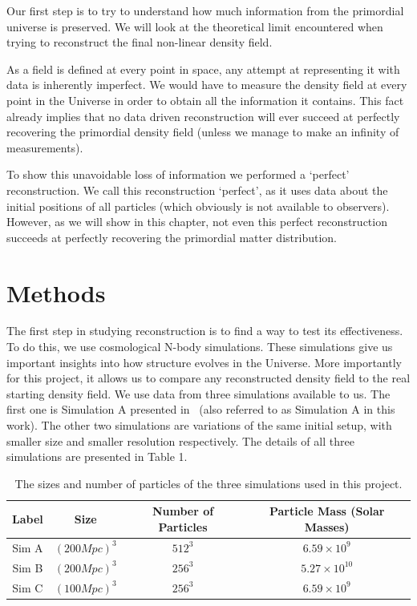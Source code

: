 
Our first step is to try to understand how much information from the primordial universe is preserved. We will look at the theoretical limit encountered when trying to reconstruct the final non-linear density field. 

As a field is defined at every point in space, any attempt at representing it with data is inherently imperfect. We would have to measure the density field at every point in the Universe in order to obtain all the information it contains. This fact already implies that no data driven reconstruction will ever succeed at perfectly recovering the primordial density field (unless we manage to make an infinity of measurements).

To show this unavoidable loss of information we performed a `perfect' reconstruction. We call this reconstruction `perfect', as it uses data about the initial positions of all particles (which obviously is not available to observers). However, as we will show in this chapter, not even this perfect reconstruction succeeds at perfectly recovering the primordial matter distribution.

\section{Methods}


The first step in studying reconstruction is to find a way to test its effectiveness. To do this, we use cosmological N-body simulations. These simulations give us important insights into how structure evolves in the Universe. More importantly for this project, it allows us to compare any reconstructed density field to the real starting density field. We use data from three simulations available to us. The first one is Simulation A presented in~\cite{Pontzen_paired_simulations} (also referred to as Simulation A in this work). The other two simulations are variations of the same initial setup, with smaller size and smaller resolution respectively. The details of all three simulations are presented in Table 1.

\begin{table}[h!]
    \centering
    \begin{tabular}{ |c|c|c|c| } 
        \hline
        Label & Size & Number of Particles & Particle Mass (Solar Masses) \\
        \hline
        Sim A & $(200 Mpc)^3$ & $512^3$ & $6.59 \times 10^9$ \\ 
        \hline
        Sim B & $(200 Mpc)^3$ & $256^3$ & $5.27 \times 10^{10}$ \\ 
        \hline
        Sim C & $(100 Mpc)^3$ & $256^3$ & $6.59 \times 10^9$ \\ 
        \hline
        
    \end{tabular}
    \caption{The sizes and number of particles of the three simulations used in this project.}
    \label{table:1}
\end{table}

